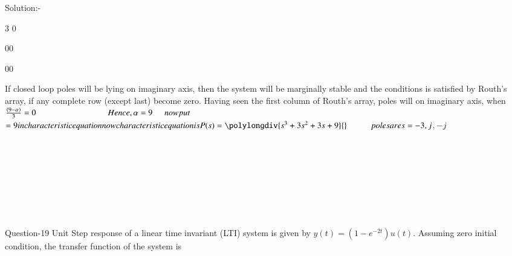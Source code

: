 \documentclass[journal,12pt,twocolumn]{IEEEtran}
\begin{document}
\begin{frame}{Solution:- }
\begin{frame}{}
\begin{frame}{}
  \hspace{3cm}  \hspace{1cm} 3\hspace{1cm} \alpha\hspace{1cm} 0 \hfill\break
  
  \hspace{3cm}  \hspace{1cm}  \hspace{0.5cm}0\hspace{1cm}0
  
  \hspace{3cm} \hspace{1cm} \alpha\hspace{1cm} \hspace{0.5cm}0\hspace{1cm}0\hfill \break
  \end{frame}
\begin{frame}{}
  If closed loop poles will be lying on imaginary axis, then the system will be marginally stable and the
conditions is satisfied by Routh’s array, if any complete row (except last) become zero.
 Having seen the first column of Routh’s array, poles will on imaginary axis, when \\
 
 \hspace{3cm}     $\frac{(9-\alpha)}{3}=0 \hfill \break
  
  \hspace{3cm}   Hence, \alpha=9
  
  \hspace{0.5cm} now put $\alpha$=9 in characteristic equation 
  now characteristic equation is P(s)=\polylongdiv{s^3+3s^2+3s+9}{}\hfill\break
  
  \hspace{1cm} poles are s= -3,j$$ ,-j$
  
\\\\\\\  
\end{frame}
\\\\
\begin{frame}{Question-19 }
Unit Step response of a linear time invariant (LTI) system is given by $y(t) = (1 - e^{-2t})u(t)$. Assuming zero initial condition, the transfer function of the system is 

\vskip 1cm


\end{frame}
\end{frame}
\end{frame}
\end{document}
